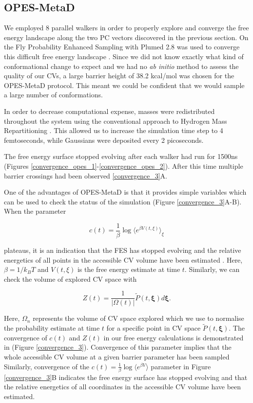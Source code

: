 \subsection{OPES-MetaD}
We employed 8 parallel walkers in order to properly explore and converge the free energy landscape along the two PC vectors discovered in the previous section. On the Fly Probability Enhanced Sampling with Plumed 2.8 was used to converge this difficult free energy landscape \cite{invernizzi2020, tribello2014}. Since we did not know exactly what kind of conformational change to expect and we had no \textit {ab initio} method to assess the quality of our CVs, a large barrier height of 38.2 kcal/mol was chosen for the OPES-MetaD protocol. This meant we could be confident that we would sample a large number of conformations. 

In order to decrease computational expense, masses were redistributed throughout the system using the conventional approach to Hydrogen Mass Repartitioning \cite{hopkins2015, balusek2019}. This allowed us to increase the simulation time step to 4 femtoseconds, while Gaussians were deposited every 2 picoseconds.

The free energy surface stopped evolving after each walker had run for 1500ns (Figures \ref{convergence_opes_1}-\ref{convergence_opes_2}). After this time multiple barrier crossings had been observed \ref{convergence_3}A.

One of the advantages of OPES-MetaD is that it provides simple variables which can be used to check the status of the simulation (Figure \ref{convergence_3}A-B). When the parameter 

\begin{equation}
	c(t) = \frac{1}{\beta} \log \langle e^{\beta V(t,\xi)} \rangle_\xi
\end{equation} 

plateaus, it is an indication that the FES has stopped evolving and the relative energetics of all points in the accessible CV volume have been estimated \cite{invernizzi2020, tiwary2015}. Here, $\beta=1/k_BT$ and $V(t,\xi)$ is the free energy estimate at time $t$. Similarly, we can check the volume of explored CV space with  

\begin{equation}
Z(t) = \frac{1}{| \Omega(t)|}  \tilde{P}(t, \mathbf{\xi}) d\mathbf{\xi}.
\end{equation} 

Here, $\Omega_n$ represents the volume of CV space explored which we use to normalise the probability estimate at time $t$ for a specific point in CV space $\tilde{P}(t, \mathbf{\xi})$. The convergence of $c(t)$ and $Z(t)$ in our free energy calculations is demonstrated in (Figure \ref{convergence_3}). Convergence of this parameter implies that the whole accessible CV volume at a given barrier parameter has been sampled Similarly, convergence of the $c(t) = \frac{1}{\beta} \log \langle e^{\beta V} \rangle$ parameter in Figure \ref{convergence_3}B indicates the free energy surface has stopped evolving and that the relative energetics of all coordinates in the accessible CV volume have been estimated.  

